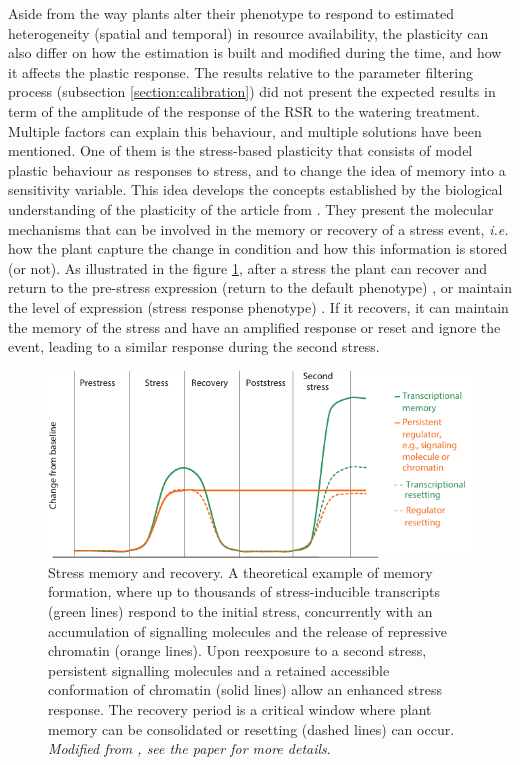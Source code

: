 Aside from the way plants alter their phenotype to respond to estimated heterogeneity (spatial and temporal) in resource availability, the plasticity can also differ on how the estimation is built and modified during the time, and how it affects the plastic response. The results relative to the parameter filtering process (subsection \ref{section:calibration}) did not present the expected results in term of the amplitude of the response of the RSR to the watering treatment. Multiple factors can explain this behaviour, and multiple solutions have been mentioned. One of them is the stress-based plasticity that consists of model plastic behaviour as responses to stress, and to change the idea of memory into a sensitivity variable. This idea develops the concepts established by the biological understanding of the plasticity of the article from \citet{crisp_reconsidering_2016}. They present the molecular mechanisms that can be involved in the memory or recovery of a stress event, \textit{i.e.} how the plant capture the change in condition and how this information is stored (or not). As illustrated in the figure \ref{fig:stress_memory}, after a stress the plant can recover and return to the pre-stress expression (return to the default phenotype) \parencite{liu_biomass_2004}, or maintain the level of expression (stress response phenotype) \parencite{peterson_growth_1982}. If it recovers, it can maintain the memory of the stress and have an amplified response or reset and ignore the event, leading to a similar response during the second stress.



\begin{figure}
\includegraphics[width = \textwidth]{./2_PP/Figures/Concepts/stress_memory.pdf}
\caption[Stress memory and recovery]{Stress memory and recovery. A theoretical example of memory formation, where up to thousands of stress-inducible transcripts (green lines) respond to the initial stress, concurrently with an accumulation of signalling molecules and the release of repressive chromatin (orange lines). Upon reexposure to a second stress, persistent signalling molecules and a retained accessible conformation of chromatin (solid lines) allow an enhanced stress response. The recovery period is a critical window where plant memory can be consolidated or resetting (dashed lines) can occur. \textit{Modified from \citet{crisp_reconsidering_2016}, see the paper for more details}.}\label{fig:stress_memory}
\end{figure}

